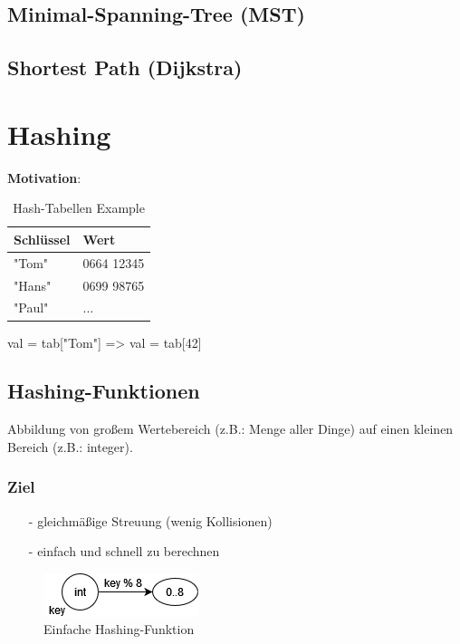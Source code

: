\documentclass{article}
\newcommand\Tstrut{\rule{0pt}{2.6ex}}         %
\begin{document}
\subsection{Minimal-Spanning-Tree (MST)}
\subsection{Shortest Path (Dijkstra)}

\newpage
\section{Hashing}


 {\bf Motivation}:
\begin{table}[h!]
  \centering
  \begin{tabular}{l|l}
    {\bf Schlüssel} & {\bf Wert}         \\
    \hline
    "Tom"           & 0664 12345 \Tstrut \\
    "Hans"          & 0699 98765         \\
    "Paul"          & ...                \\
  \end{tabular}
  \caption{Hash-Tabellen Example}
  \label{tab:hash_table_example}
\end{table}

val = tab["Tom"] => val = tab[42]

\subsection{Hashing-Funktionen}

Abbildung von großem Wertebereich (z.B.: Menge aller Dinge) auf einen kleinen Bereich (z.B.: integer).

\subsubsection{Ziel}

\begin{itemize}
  \item[-] gleichmäßige Streuung (wenig Kollisionen)
  \item[-] einfach und schnell zu berechnen
\end{itemize}

\begin{figure}[h!]
  \centering
  \includegraphics[scale=0.8]{hashing_easy.png}
  \caption{Einfache Hashing-Funktion}
  \label{fig:hashing_easy}
\end{figure}
\end{document}
